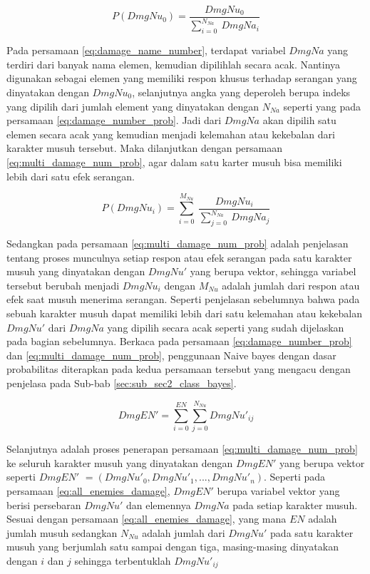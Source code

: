 \begin{equation}\label{eq:damage_number_prob}
P(DmgNu_{0}) = \frac{DmgNu_{0}}{\sum_{i = 0}^{N_{Na}}\ DmgNa_{i}}
\end{equation}

Pada persamaan \ref{eq:damage_name_number}, terdapat variabel $DmgNa$ yang terdiri dari banyak nama elemen, kemudian dipilihlah secara acak. Nantinya digunakan sebagai elemen yang memiliki respon khusus terhadap serangan yang dinyatakan dengan $DmgNu_{0}$, selanjutnya angka yang deperoleh berupa indeks yang dipilih dari jumlah element yang dinyatakan dengan $N_{Na}$ seperti yang pada persamaan \ref{eq:damage_number_prob}. Jadi dari $DmgNa$ akan dipilih satu elemen secara acak yang kemudian menjadi kelemahan atau kekebalan dari karakter musuh tersebut. Maka dilanjutkan dengan persamaan \ref{eq:multi_damage_num_prob}, agar dalam satu karter musuh bisa memiliki lebih dari satu efek serangan.
\vspace{1ex}

\begin{equation}\label{eq:multi_damage_num_prob}
P(DmgNu_{i}) = \sum_{i = 0}^{M_{Nu}}\ \frac{DmgNu_{i}}{\sum_{j = 0}^{N_{Na}}\ DmgNa_{j}}
\end{equation}

Sedangkan pada persamaan \ref{eq:multi_damage_num_prob} adalah penjelasan tentang proses munculnya setiap respon atau efek serangan pada satu karakter musuh yang dinyatakan dengan $DmgNu'$ yang berupa vektor, sehingga variabel tersebut berubah menjadi $DmgNu_{i}$ dengan $M_{Nu}$ adalah jumlah dari respon atau efek saat musuh menerima serangan. Seperti penjelasan sebelumnya bahwa pada sebuah karakter musuh dapat memiliki lebih dari satu kelemahan atau kekebalan $DmgNu'$ dari $DmgNa$ yang dipilih secara acak seperti yang sudah dijelaskan pada bagian sebelumnya. Berkaca pada persamaan \ref{eq:damage_number_prob} dan \ref{eq:multi_damage_num_prob}, penggunaan Naive bayes dengan dasar probabilitas diterapkan pada kedua persamaan tersebut yang mengacu dengan penjelasa pada Sub-bab \ref{sec:sub_sec2_class_bayes}.
\vspace{1ex}

\begin{equation}\label{eq:all_enemies_damage}
DmgEN' = \sum_{i = 0}^{EN}\sum_{j = 0}^{N_{Nu}} DmgNu'_{ij}
\end{equation}

Selanjutnya adalah proses penerapan persamaan \ref{eq:multi_damage_num_prob} ke seluruh karakter musuh yang dinyatakan dengan $DmgEN'$ yang berupa vektor seperti $DmgEN'$ $= \left (DmgNu'_{0}, DmgNu'_{1}, ..., DmgNu'_{n} \right )$. Seperti pada persamaan \ref{eq:all_enemies_damage}, $DmgEN'$ berupa variabel vektor yang berisi persebaran $DmgNu'$ dan elemennya $DmgNa$ pada setiap karakter musuh. Sesuai dengan persamaan \ref{eq:all_enemies_damage}, yang mana $EN$ adalah jumlah musuh sedangkan $N_{Nu}$ adalah jumlah dari $DmgNu'$ pada satu karakter musuh yang berjumlah satu sampai dengan tiga, masing-masing dinyatakan dengan $i$ dan $j$ sehingga terbentuklah $DmgNu'_{ij}$ 
\vspace{1ex}

